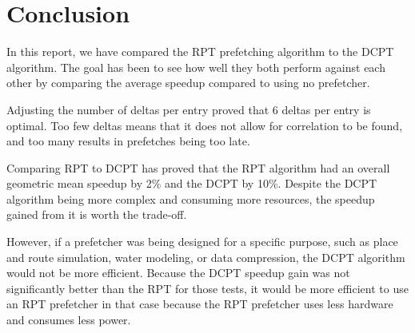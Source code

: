 \section{Conclusion}\label{sec:conclusion}
In this report, we have compared the RPT prefetching algorithm to the DCPT algorithm. The goal has been to see how well they both perform against each other by comparing the average speedup compared to using no prefetcher. 

Adjusting the number of deltas per entry proved that 6 deltas per entry is optimal. Too few deltas means that it does not allow for correlation to be found, and too many results in prefetches being too late.

Comparing RPT to DCPT has proved that the RPT algorithm had an overall geometric mean speedup by 2\% and the DCPT by 10\%. Despite the DCPT algorithm being more complex and consuming more resources, the speedup gained from it is worth the trade-off.

However, if a prefetcher was being designed for a specific purpose, such as place and route simulation, water modeling, or data compression, the DCPT algorithm would not be more efficient. Because the DCPT speedup gain was not significantly better than the RPT for those tests, it would be more efficient to use an RPT prefetcher in that case because the RPT prefetcher uses less hardware and consumes less power.
